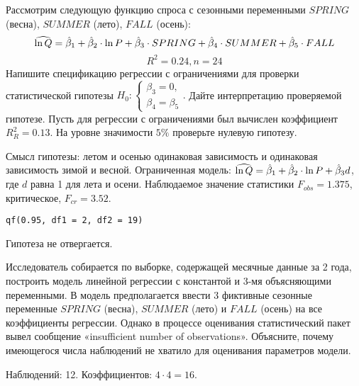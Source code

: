 \begin{problem} %
 Рассмотрим следующую функцию спроса с сезонными переменными $SPRING$ (весна), $SUMMER$ (лето), $FALL$ (осень):
\[
\widehat{\ln Q}=\hat{\beta}_1+\hat{\beta}_2\cdot{\ln P}+\hat{\beta}_3\cdot{SPRING}+\hat{\beta}_4\cdot{SUMMER}+\hat{\beta}_5\cdot{FALL}
\]
\[
R^2=0.24,n=24
\]
Напишите спецификацию регрессии с ограничениями для проверки статистической гипотезы
$H_0:
  \begin{cases}
    \beta_3=0, \\
    \beta_4=\beta_5
 \end{cases}.$
Дайте интерпретацию проверяемой гипотезе. Пусть для регрессии с ограничениями был вычислен коэффициент $R_{R}^2=0.13$. На уровне значимости $5\%$ проверьте нулевую гипотезу.


\begin{sol}
Смысл гипотезы: летом и осенью одинаковая зависимость и одинаковая зависимость зимой и весной. Ограниченная модель: $\widehat{\ln Q}=\hat{\beta}_1+\hat{\beta}_2\cdot{\ln P}+\hat{\beta}_3 d$, где $d$ равна 1 для лета и осени. Наблюдаемое значение статистики $F_{obs}=1.375$, критическое, $F_{cr}=3.52$.
\begin{verbatim}
qf(0.95, df1 = 2, df2 = 19)
\end{verbatim}
Гипотеза не отвергается.
\end{sol}
\end{problem}



\begin{problem}
Исследователь собирается по выборке, содержащей месячные данные за 2 года,
построить модель линейной регрессии с константой и 3-мя объясняющими переменными. В модель предполагается ввести 3 фиктивные сезонные переменные $SPRING$ (весна), $SUMMER$ (лето) и $FALL$ (осень) на все коэффициенты регрессии. Однако в процессе оценивания статистический пакет вывел сообщение «insufficient number of observations». Объясните, почему имеющегося числа наблюдений не хватило для оценивания параметров модели.


\begin{sol}
Наблюдений: 12. Коэффициентов: $4 \cdot 4 = 16$.
\end{sol}
\end{problem}



